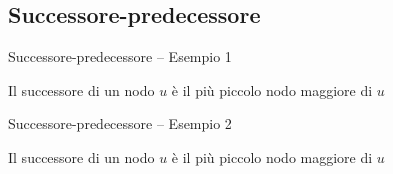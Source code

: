 \subsection{Successore-predecessore}

\begin{frame}{Successore-predecessore -- Esempio 1}

\begin{myboxtitle}[Definizione]
Il \alert{successore} di un nodo $u$ è il più piccolo nodo maggiore di $u$ 
\end{myboxtitle}


\end{frame}

\begin{frame}{Successore-predecessore -- Esempio 2}

\begin{myboxtitle}[Definizione]
Il \alert{successore} di un nodo $u$ è il più piccolo nodo maggiore di $u$ 
\end{myboxtitle}


\end{frame}



